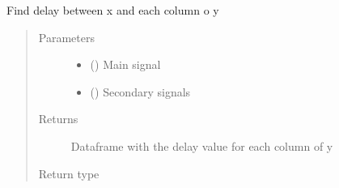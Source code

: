\documentclass[letterpaper,10pt,english]{sphinxmanual}
\begin{document}
\begin{fulllineitems}
\label{\detokenize{correlator:correlator.find_delays}}
\sphinxAtStartPar
Find delay between x and each column o y
\begin{quote}\begin{description}
\item[{Parameters}] \leavevmode\begin{itemize}
\item {} 
\sphinxAtStartPar
{} () \textendash{} Main signal

\item {} 
\sphinxAtStartPar
{} () \textendash{} Secondary signals

\end{itemize}

\item[{Returns}] \leavevmode
\sphinxAtStartPar
Dataframe with the delay value for each column of y

\item[{Return type}] \leavevmode
\sphinxAtStartPar
{}

\end{description}\end{quote}

\end{fulllineitems}

\end{document}
